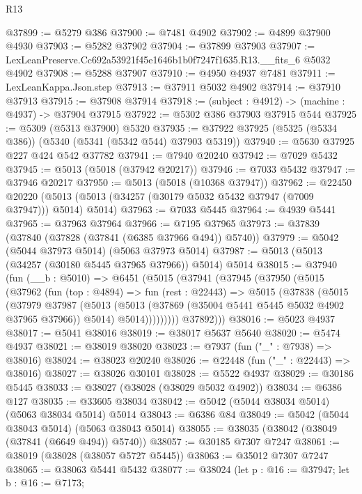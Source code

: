 \begin{lexlean}{R13}
\begin{coremodule}
@37899 := @5279 @386
@37900 := @7481 @4902
@37902 := @4899 @37900 @4930
@37903 := @5282 @37902
@37904 := @37899 @37903
@37907 := LexLeanPreserve.Cc692a53921f45e1646b1b0f7247f1635.R13.__fits_6 @5032 @4902
@37908 := @5288 @37907
@37910 := @4950 @4937 @7481
@37911 := LexLeanKappa.Json.step
@37913 := @37911 @5032 @4902
@37914 := @37910 @37913
@37915 := @37908 @37914
@37918 := (subject : @4912) -> (machine : @4937) -> @37904 @37915
@37922 := @5302 @386 @37903 @37915 @544
@37925 := @5309 (@5313 @37900) @5320
@37935 := @37922 @37925 (@5325 (@5334 @386)) (@5340 (@5341 (@5342 @544) @37903 @5319))
@37940 := @5630 @37925 @227 @424 @542 @37782
@37941 := @7940 @20240
@37942 := @7029 @5432
@37945 := @5013 (@5018 (@37942 @20217))
@37946 := @7033 @5432
@37947 := @37946 @20217
@37950 := @5013 (@5018 (@10368 @37947))
@37962 := @22450
    @20220
    (@5013 (@5013 (@34257 (@30179 @5032 @5432 @37947 (@7009 @37947))) @5014) @5014)
@37963 := @7033 @5445
@37964 := @4939 @5441
@37965 := @37963 @37964
@37966 := @7195 @37965
@37973 := @37839 (@37840 (@37828 (@37841 (@6385 @37966 @494)) @5740))
@37979 := @5042 (@5044 @37973 @5014) (@5063 @37973 @5014)
@37987 := @5013 (@5013 (@34257 (@30180 @5445 @37965 @37966)) @5014) @5014
@38015 := @37940
    (fun (__b : @5010) =>
    @6451
      (@5015
        (@37941
          (@37945
            (@37950
              (@5015
                (@37962
                  (fun (top : @4894) =>
                  fun (rest : @22443) =>
                  @5015
                    (@37838
                      (@5015
                        (@37979
                          @37987
                          (@5013
                            (@5013 (@37869 (@35004 @5441 @5445 @5032 @4902 @37965 @37966)) @5014)
                            @5014)))))))))
          @37892)))
@38016 := @5023 @4937
@38017 := @5041 @38016
@38019 := @38017 @5637 @5640
@38020 := @5474 @4937
@38021 := @38019 @38020
@38023 := @7937 (fun ("_" : @7938) => @38016)
@38024 := @38023 @20240
@38026 := @22448 (fun ("_" : @22443) => @38016)
@38027 := @38026 @30101
@38028 := @5522 @4937
@38029 := @30186 @5445
@38033 := @38027 (@38028 (@38029 @5032 @4902))
@38034 := @6386 @127
@38035 := @33605 @38034
@38042 := @5042 (@5044 @38034 @5014) (@5063 @38034 @5014) @5014
@38043 := @6386 @84
@38049 := @5042 (@5044 @38043 @5014) (@5063 @38043 @5014)
@38055 := @38035 (@38042 (@38049 (@37841 (@6649 @494)) @5740))
@38057 := @30185 @7307 @7247
@38061 := @38019 (@38028 (@38057 @5727 @5445))
@38063 := @35012 @7307 @7247
@38065 := @38063 @5441 @5432
@38077 := @38024
    (let p : @16 := @37947;
    let b : @16 := @7173;

\end{coremodule}
\end{lexlean}
